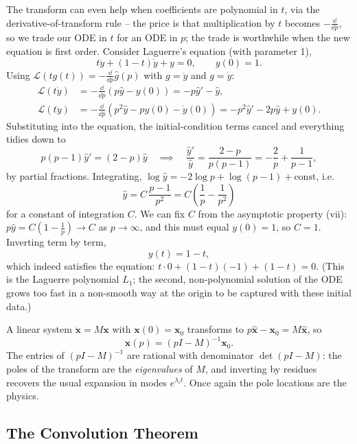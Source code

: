 \documentclass[a4paper]{scrartcl}
\begin{document}
\begin{example}
	The transform can even help when coefficients are polynomial in $t$, via the derivative-of-transform rule -- the price is that multiplication by $t$ becomes $-\frac{\dd}{\dd p}$, so we trade our ODE in $t$ for an ODE in $p$; the trade is worthwhile when the new equation is first order. Consider Laguerre's equation (with parameter 1),
	$$
	t \ddot y + (1 - t) \dot y + y = 0, \qquad y(0) = 1.
	$$
	Using $\mathcal L(t g(t)) = -\frac{\dd}{\dd p}\hat g(p)$ with $g = \ddot y$ and $g = \dot y$:
	\begin{align*}
	\mathcal L(t\dot y) &= -\frac{\dd}{\dd p}(p\hat y - y(0)) = -p \hat y' - \hat y, \\
	\mathcal L(t \ddot y) &= -\frac{\dd}{\dd p}\left(p^2 \hat y - p y(0) - \dot y(0)\right) = -p^2 \hat y' - 2p\hat y + y(0).
	\end{align*}
	Substituting into the equation, the initial-condition terms cancel and everything tidies down to
	$$
	p(p - 1)\hat y' = (2 - p) \hat y \quad\implies\quad \frac{\hat y'}{\hat y} = \frac{2 - p}{p(p-1)} = -\frac{2}{p} + \frac{1}{p - 1},
	$$
	by partial fractions. Integrating, $\log \hat y = -2\log p + \log(p - 1) + \text{const}$, i.e.
	$$
	\hat y = C\, \frac{p - 1}{p^2} = C\left(\frac 1p - \frac{1}{p^2}\right)
	$$
	for a constant of integration $C$. We can fix $C$ from the asymptotic property (vii): $p \hat y = C(1 - \frac 1p) \to C$ as $p \to \infty$, and this must equal $y(0) = 1$, so $C = 1$. Inverting term by term,
	$$
	y(t) = 1 - t,
	$$
	which indeed satisfies the equation: $t \cdot 0 + (1 - t)(-1) + (1 - t) = 0$. (This is the Laguerre polynomial $L_1$; the second, non-polynomial solution of the ODE grows too fast in a non-smooth way at the origin to be captured with these initial data.)
\end{example}

\begin{example}
	A linear system $\dot{\mathbf x} = M \mathbf x$ with $\mathbf x(0) = \mathbf x_0$ transforms to $p \hat{\mathbf x} - \mathbf x_0 = M \hat{\mathbf x}$, so
	$$
	\hat{\mathbf x}(p) = (pI - M)^{-1} \mathbf x_0.
	$$
	The entries of $(pI - M)^{-1}$ are rational with denominator $\det(pI - M)$: the poles of the transform are the \emph{eigenvalues} of $M$, and inverting by residues recovers the usual expansion in modes $e^{\lambda_i t}$. Once again the pole locations are the physics.
\end{example}

\subsection{The Convolution Theorem}
\end{document}
